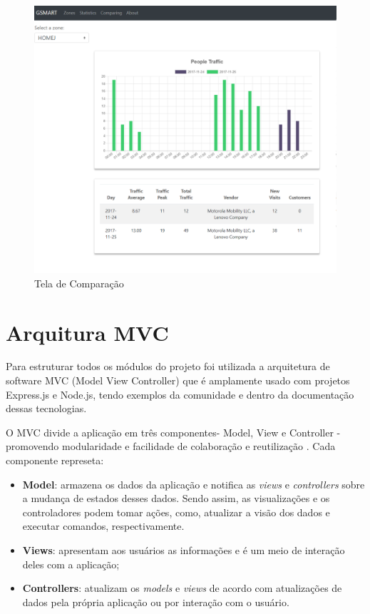 \begin{figure}[!h]
  \caption{\label{comparing-ap}Tela de Comparação}
  \begin{center}
    \includegraphics[width=1.0\textwidth]{img/comparing.png}
  \end{center}
\end{figure}

\section{Arquitura MVC}
Para estruturar todos os módulos do projeto foi utilizada a arquitetura de
software MVC (Model View Controller) que é amplamente usado com projetos
Express.js e Node.js, tendo exemplos da comunidade e dentro da documentação dessas
tecnologias.

O MVC divide a aplicação em três componentes- Model, View e Controller -
promovendo modularidade e facilidade de colaboração e reutilização \cite{mdn}. Cada componente represeta:

\begin{itemize}
    \item \textbf{Model}: armazena os dados da aplicação e notifica as \emph{views} e
    \emph{controllers} sobre a mudança de estados desses dados. Sendo assim, as visualizações e os controladores
    podem tomar ações, como, atualizar a visão dos dados e executar comandos, respectivamente.
    \item \textbf{Views}: apresentam aos usuários as informações e é um meio de interação deles com
    a aplicação;
    \item \textbf{Controllers}: atualizam os \emph{models} e \emph{views} de acordo
    com atualizações de dados pela própria aplicação ou por interação com o usuário.
\end{itemize}

